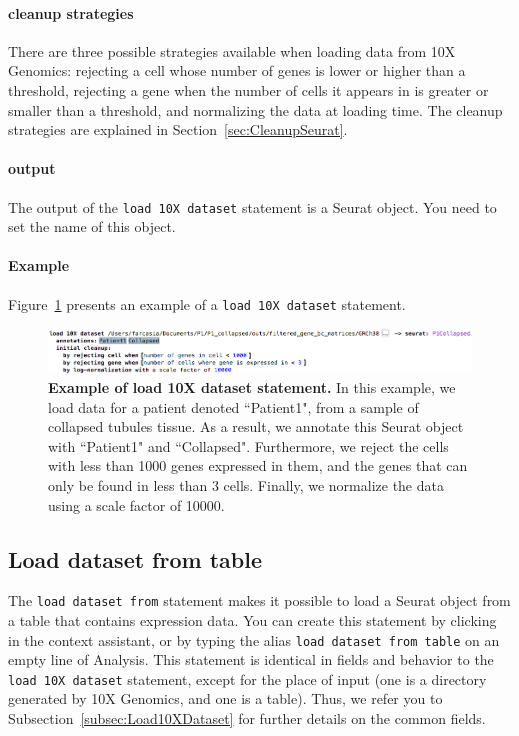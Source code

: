 \paragraph{cleanup strategies}
There are three possible strategies available when loading data from 10X Genomics: rejecting
a cell whose number of genes is lower or higher than a threshold, rejecting a
gene when the number of cells it appears in is greater or smaller than a threshold, and
normalizing the data at loading time. The cleanup strategies are explained in
Section~\ref{sec:CleanupSeurat}.

\paragraph{output} The output of the \texttt{load 10X dataset} statement is a Seurat object.
You need to set the name of this object.

\paragraph{Example} Figure~\ref{fig:ExampleLoad10XDataset} presents an example of a
\texttt{load 10X dataset} statement.

\begin{figure}[h!tbp]
  \centering
  \includegraphics[width=\figWidthWide]{figures/ExampleLoad10XDataset.png}
    \caption[Example of load 10X dataset statement.]{\textbf{Example of load 10X dataset statement.}
    In this example, we load data for a patient denoted ``Patient1", from a sample of collapsed
    tubules tissue. As a result, we annotate this Seurat object with ``Patient1" and
    ``Collapsed". Furthermore, we reject the cells with less than 1000 genes expressed in
    them, and the genes that can only be found in less than 3 cells. Finally, we normalize
    the data using a scale factor of 10000.}
\label{fig:ExampleLoad10XDataset}
\end{figure}

\subsection{Load dataset from table}
The \texttt{load dataset from} statement makes it possible to load a Seurat object from a
table that contains expression data. You can create this statement by clicking
 in the context assistant, or by typing
the alias \texttt{load dataset from table} on an empty line of Analysis. This statement
is identical in fields and behavior to the \texttt{load 10X dataset} statement, except
for the place of input (one is a directory generated by 10X Genomics, and one is a table).
Thus, we refer you to Subsection~\ref{subsec:Load10XDataset} for further details on the common fields.

